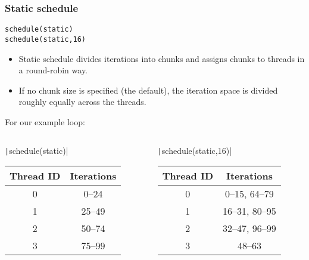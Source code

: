 \documentclass{beamer}
\begin{document}
\begin{frame}[fragile]
\frametitle{Static schedule}
\begin{verbatim}
schedule(static)
schedule(static,16)
\end{verbatim}

\begin{itemize}
\item Static schedule divides iterations into chunks and assigns chunks to threads in a round-robin way.
\item If no chunk size is specified (the default), the iteration space is divided roughly equally across the threads.
\end{itemize}
For our example loop:
\begin{columns}
\begin{column}{0.5\textwidth}
  \texttt|schedule(static)|
  \begin{tabular}{cc}
  \toprule
  Thread ID & Iterations \\
  \midrule
  0 &  0--24 \\
  1 & 25--49 \\
  2 & 50--74 \\
  3 & 75--99 \\
  \bottomrule
  \end{tabular}
\end{column}

\begin{column}{0.5\textwidth}
  \texttt|schedule(static,16)|
  \begin{tabular}{cc}
  \toprule
  Thread ID & Iterations \\
  \midrule
  0 &  0--15, 64--79 \\
  1 & 16--31, 80--95 \\
  2 & 32--47, 96--99 \\
  3 & 48--63 \\
  \bottomrule
  \end{tabular}
\end{column}
\end{columns}

\end{frame}
\end{document}

